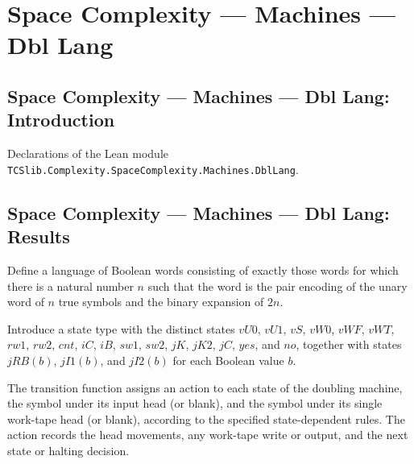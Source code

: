 \section{Space Complexity --- Machines --- Dbl Lang}
\subsection*{Space Complexity --- Machines --- Dbl Lang: Introduction}

Declarations of the Lean module \texttt{TCSlib.Complexity.SpaceComplexity.Machines.DblLang}.

\subsection*{Space Complexity --- Machines --- Dbl Lang: Results}

\begin{definition}
\label{Complexity.LogProg.dblLang}
\leanok
{}
Define a language of Boolean words consisting of exactly those words for which there is
a natural number $n$ such that the word is the pair encoding of the unary word of $n$
true symbols and the binary expansion of $2n$.
\end{definition}

\begin{definition}
\label{Complexity.LogProg.Dbl.St}
\leanok
Introduce a state type with the distinct states $vU0$, $vU1$, $vS$, $vW0$, $vWF$, $vWT$,
$rw1$, $rw2$, $cnt$, $iC$, $iB$, $sw1$, $sw2$, $jK$, $jK2$, $jC$, $yes$, and $no$,
together with states $jRB(b)$, $jI1(b)$, and $jI2(b)$ for each Boolean value $b$.
\end{definition}

\begin{definition}
\label{Complexity.LogProg.Dbl.tr}
\leanok
{}
The transition function assigns an action to each state of the doubling machine, the
symbol under its input head (or blank), and the symbol under its single work-tape head
(or blank), according to the specified state-dependent rules. The action records the
head movements, any work-tape write or output, and the next state or halting decision.
\end{definition}

